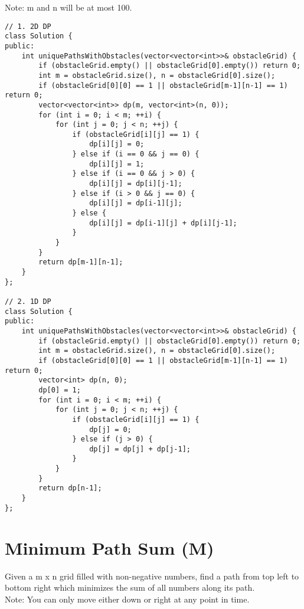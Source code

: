 Note: m and n will be at most 100.\\

\begin{lstlisting}
// 1. 2D DP
class Solution {
public:
    int uniquePathsWithObstacles(vector<vector<int>>& obstacleGrid) {
        if (obstacleGrid.empty() || obstacleGrid[0].empty()) return 0;
        int m = obstacleGrid.size(), n = obstacleGrid[0].size();
        if (obstacleGrid[0][0] == 1 || obstacleGrid[m-1][n-1] == 1) return 0;
        vector<vector<int>> dp(m, vector<int>(n, 0));
        for (int i = 0; i < m; ++i) {
            for (int j = 0; j < n; ++j) {
                if (obstacleGrid[i][j] == 1) {
                    dp[i][j] = 0;
                } else if (i == 0 && j == 0) {
                    dp[i][j] = 1;
                } else if (i == 0 && j > 0) {
                    dp[i][j] = dp[i][j-1];
                } else if (i > 0 && j == 0) {
                    dp[i][j] = dp[i-1][j];
                } else {
                    dp[i][j] = dp[i-1][j] + dp[i][j-1];
                }
            }
        }
        return dp[m-1][n-1];
    }
};

// 2. 1D DP
class Solution {
public:
    int uniquePathsWithObstacles(vector<vector<int>>& obstacleGrid) {
        if (obstacleGrid.empty() || obstacleGrid[0].empty()) return 0;
        int m = obstacleGrid.size(), n = obstacleGrid[0].size();
        if (obstacleGrid[0][0] == 1 || obstacleGrid[m-1][n-1] == 1) return 0;
        vector<int> dp(n, 0);
        dp[0] = 1;
        for (int i = 0; i < m; ++i) {
            for (int j = 0; j < n; ++j) {
                if (obstacleGrid[i][j] == 1) {
                    dp[j] = 0;
                } else if (j > 0) {
                    dp[j] = dp[j] + dp[j-1];
                }
            }
        }
        return dp[n-1];
    }
};
\end{lstlisting}


\section{Minimum Path Sum (M)}
Given a m x n grid filled with non-negative numbers, find a path from top left to bottom right which minimizes the sum of all numbers along its path.\\

Note: You can only move either down or right at any point in time.\\

